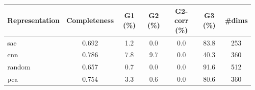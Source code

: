 \begin{tabular}{lcccccc}
\toprule
Representation & Completeness & G1 (\%) & G2 (\%) & G2-corr (\%) & G3 (\%) & \#dims \\
\midrule
sae & 0.692 & 1.2 & 0.0 & 0.0 & 83.8 & 253 \\
cnn & 0.786 & 7.8 & 9.7 & 0.0 & 40.3 & 360 \\
random & 0.657 & 0.7 & 0.0 & 0.0 & 91.6 & 512 \\
pca & 0.754 & 3.3 & 0.6 & 0.0 & 80.6 & 360 \\
\bottomrule
\end{tabular}